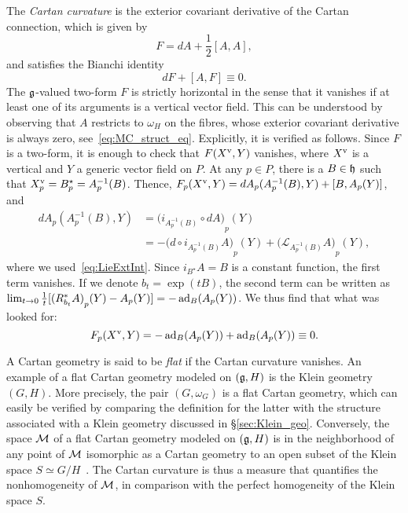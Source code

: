 \documentclass[
final,
11pt,
a4paper,
DIV=11,
headinclude=true,
footinclude=false,
bibliography=totoc,
twoside=true,  %
BCOR=5mm
]{scrbook}
\begin{document}
The \emph{Cartan curvature} is the exterior covariant derivative 
of the Cartan connection, which is given by
\begin{equation}
  \label{eq:Cartan_curv}
  F = dA + \frac{1}{2}[A,A],
\end{equation}
and satisfies the Bianchi identity
\begin{equation}
\label{eq:cartan_bianchi}
  dF + [A,F] \equiv 0.
\end{equation}
The $\mathfrak{g}$-valued two-form $F$ is strictly horizontal in the 
sense that it vanishes if at least one of its arguments is a 
vertical vector field. This can be understood by observing that 
$A$ restricts to $\omega_H$ on the fibres, whose exterior 
covariant derivative is always zero, see~\eqref{eq:MC_struct_eq}.  
Explicitly, it is verified as follows. Since $F$ is a two-form, 
it is enough to check that $F(X^\mathrm{v},Y)$ vanishes, where 
$X^\mathrm{v}$ is a vertical and $Y$ a generic vector field on $P$.  
At any $p \in P$, there is a $B \in \mathfrak{h}$ such that 
$X^\mathrm{v}_p = B^\star_p = A^{-1}_p(B)$.  Thence,
$F_p(X^\mathrm{v},Y) = dA_p(A^{-1}_p(B), Y) + [B,A_p(Y)]$, and
\begin{align*}
  dA_p(A^{-1}_p(B), Y)  &= {\big(i_{A^{-1}_p(B)} \circ 
    dA\big)}_p(Y)
  \\
  &= -{\big(d \circ i_{A^{-1}_p(B)} A\big)}_p(Y)  
  + {\big(\mathscr{L}_{A^{-1}_p(B)} A\big)}_p(Y),
\end{align*}
where we used~\eqref{eq:LieExtInt}.
Since $i_{B^\star} A = B$ is a constant function, the first term 
vanishes. If we denote $b_t = \exp(tB)$, the second term can be 
written as $\lim_{t \to 0} \tfrac{1}{t} [ {(R_{b_t}^*A)}_p(Y) 
- A_p(Y)] = - \operatorname{ad}_B(A_p(Y))$. We thus find that what was looked 
for:
\begin{equation*}
F_p(X^\mathrm{v},Y) = - \operatorname{ad}_B(A_p(Y)) + \operatorname{ad}_B(A_p(Y)) \equiv 0.
\end{equation*}

A Cartan geometry is said to be \emph{flat} if the Cartan 
curvature vanishes. An example of a flat Cartan geometry modeled 
on $(\mathfrak{g},H)$ is the Klein geometry $(G,H)$. More precisely, 
the pair $(G,\omega_G)$ is a flat Cartan geometry, which can 
easily be verified by comparing the definition for the latter 
with the structure associated with a Klein geometry discussed in 
\S\ref{sec:Klein_geo}. Conversely, the space $\mathcal{M}$ of a flat 
Cartan geometry modeled on $(\mathfrak{g},H)$ is in the neighborhood of 
any point of $\mathcal{M}$ isomorphic as a Cartan geometry to an open 
subset of the Klein space $S \simeq 
G/H$~\cite{sharpe1997diff_geo}. The Cartan curvature is thus a 
measure that quantifies the nonhomogeneity of $\mathcal{M}$, in 
comparison with the perfect homogeneity of the Klein space $S$.
\end{document}
